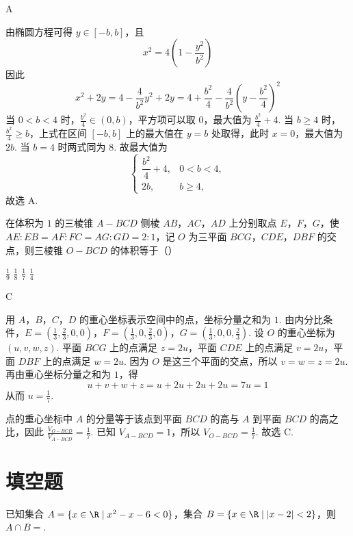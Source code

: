 \begin{answer}
A
\end{answer}

\begin{solution}
由椭圆方程可得 \(y\in[-b,b]\)，且
\[
x^2=4\left(1-\frac{y^2}{b^2}\right)
\]
因此
\[
x^2+2y=4-\frac4{b^2}y^2+2y
=4+\frac{b^2}{4}-\frac4{b^2}\left(y-\frac{b^2}{4}\right)^2
\]
当 \(0<b<4\) 时，\(\frac{b^2}{4}\in(0,b)\)，平方项可以取 \(0\)，最大值为 \(\frac{b^2}{4}+4\). 当 \(b\geqslant4\) 时，\(\frac{b^2}{4}\geqslant b\)，上式在区间 \([-b,b]\) 上的最大值在 \(y=b\) 处取得，此时 \(x=0\)，最大值为 \(2b\). 当 \(b=4\) 时两式同为 \(8\). 故最大值为
\[
\begin{cases}
\dfrac{b^2}{4}+4, & 0<b<4,\\
2b, & b\geqslant4,
\end{cases}
\]
故选 A.
\end{solution}

\begin{problem}
在体积为 \(1\) 的三棱锥 \(A-BCD\) 侧棱 \(AB\)，\(AC\)，\(AD\) 上分别取点 \(E\)，\(F\)，\(G\)，使 \(AE:EB = AF:FC = AG:GD = 2:1\)，记 \(O\) 为三平面 \(BCG\)，\(CDE\)，\(DBF\) 的交点，则三棱锥 \(O-BCD\) 的体积等于（\quad）

\choices
    {\( \frac{1}{9} \)}
    {\( \frac{1}{8} \)}
    {\( \frac{1}{7} \)}
    {\( \frac{1}{4} \)}
\end{problem}

\begin{answer}
C
\end{answer}

\begin{solution}
用 \(A\)，\(B\)，\(C\)，\(D\) 的重心坐标表示空间中的点，坐标分量之和为 \(1\). 由内分比条件，\(E=\left(\frac13,\frac23,0,0\right)\)，\(F=\left(\frac13,0,\frac23,0\right)\)，\(G=\left(\frac13,0,0,\frac23\right)\).
设 \(O\) 的重心坐标为 \((u,v,w,z)\). 平面 \(BCG\) 上的点满足 \(z=2u\)，平面 \(CDE\) 上的点满足 \(v=2u\)，平面 \(DBF\) 上的点满足 \(w=2u\). 因为 \(O\) 是这三个平面的交点，所以 \(v=w=z=2u\).
再由重心坐标分量之和为 \(1\)，得
\[
u+v+w+z=u+2u+2u+2u=7u=1
\]
从而 \(u=\frac17\).

点的重心坐标中 \(A\) 的分量等于该点到平面 \(BCD\) 的高与 \(A\) 到平面 \(BCD\) 的高之比，因此 \(\frac{V_{O-BCD}}{V_{A-BCD}}=\frac17\).
已知 \(V_{A-BCD}=1\)，所以 \(V_{O-BCD}=\frac17\). 故选 C.
\end{solution}

\section{填空题}
\begin{problem}
已知集合 \(A = \{x \in \R \mid x^2 - x - 6 < 0\}\)，集合 \(B = \{x \in \R \mid |x - 2| < 2\}\)，则 \(A \cap B =\)\fillinblank{}.
\end{problem}


